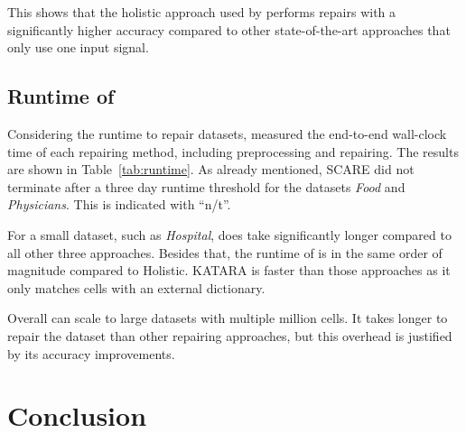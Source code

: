   This shows that the holistic approach used by \holoclean{} performs repairs with a significantly higher accuracy compared to other state-of-the-art approaches that only use one input signal.

  \subsection{Runtime of \holoclean{}}
  Considering the runtime to repair datasets, \citeauthor{holoclean} measured the end-to-end wall-clock time of each repairing method, including preprocessing and repairing.
  The results are shown in Table~\ref{tab:runtime}.
  As already mentioned, SCARE did not terminate after a three day runtime threshold for the datasets \textit{Food} and \textit{Physicians}.
  This is indicated with \enquote{n/t}.

  \begin{table}
    \caption{Runtime of \holoclean{} compared to other approaches. Obtained from~\cite{holoclean}}
    \label{tab:runtime}
  \end{table}

  For a small dataset, such as \textit{Hospital}, \holoclean{} does take significantly longer compared to all other three approaches.
  Besides that, the runtime of \holoclean{} is in the same order of magnitude compared to Holistic.
  KATARA is faster than those approaches as it only matches cells with an external dictionary.

  Overall \holoclean{} can scale to large datasets with multiple million cells.
  It takes longer to repair the dataset than other repairing approaches, but this overhead is justified by its accuracy improvements.

\section{Conclusion}\label{sec:conclusion}